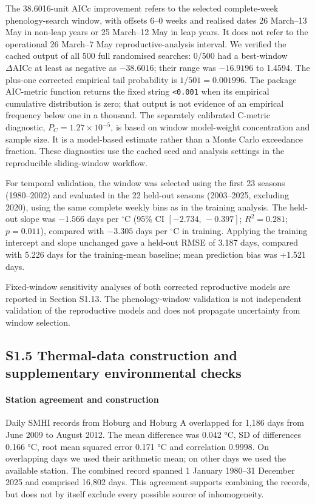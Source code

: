 \documentclass{article}
\begin{document}
The 38.6016-unit AICc improvement refers to the selected complete-week phenology-search window, with offsets 6--0 weeks and realised dates 26 March--13 May in non-leap years or 25 March--12 May in leap years. It does not refer to the operational 26 March--7 May reproductive-analysis interval. We verified the cached output of all 500 full randomised searches: 0/500 had a best-window $\Delta\mathrm{AICc}$ at least as negative as $-38.6016$; their range was $-16.9196$ to 1.4594. The plus-one corrected empirical tail probability is $1/501=0.001996$. The package AIC-metric function returns the fixed string \texttt{<0.001} when its empirical cumulative distribution is zero; that output is not evidence of an empirical frequency below one in a thousand. The separately calibrated C-metric diagnostic, $P_C=1.27\times10^{-5}$, is based on window model-weight concentration and sample size. It is a model-based estimate rather than a Monte Carlo exceedance fraction. These diagnostics use the cached seed and analysis settings in the reproducible sliding-window workflow.

For temporal validation, the window was selected using the first 23 seasons (1980--2002) and evaluated in the 22 held-out seasons (2003--2025, excluding 2020), using the same complete weekly bins as in the training analysis. The held-out slope was $-1.566$ days per $^\circ$C (95\% CI $[-2.734,\,-0.397]$; $R^2=0.281$; $p=0.011$), compared with $-3.305$ days per $^\circ$C in training. Applying the training intercept and slope unchanged gave a held-out RMSE of 3.187 days, compared with 5.226 days for the training-mean baseline; mean prediction bias was +1.521 days.

Fixed-window sensitivity analyses of both corrected reproductive models are reported in Section S1.13. The phenology-window validation is not independent validation of the reproductive models and does not propagate uncertainty from window selection.

\subsection{S1.5 Thermal-data construction and supplementary environmental checks}

\paragraph{Station agreement and construction}

Daily SMHI records from Hoburg and Hoburg A overlapped for 1,186 days from June 2009 to August 2012. The mean difference was 0.042 \si{\degreeCelsius}, SD of differences 0.166 \si{\degreeCelsius}, root mean squared error 0.171 \si{\degreeCelsius} and correlation 0.9998. On overlapping days we used their arithmetic mean; on other days we used the available station. The combined record spanned 1 January 1980--31 December 2025 and comprised 16,802 days. This agreement supports combining the records, but does not by itself exclude every possible source of inhomogeneity.
\end{document}
